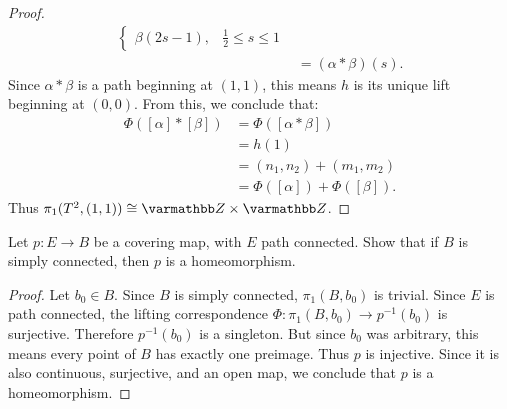 \documentclass[10pt,oneside,openany]{memoir}
\begin{document}
\begin{proof}
\begin{align*}
\begin{cases}
				\beta(2s-1), & \frac{1}{2} \leq s \leq 1
				\end{cases} \\
			&= (\alpha * \beta)(s).
		\end{align*}
	Since $\alpha \ast \beta$ is a path beginning at $(1,1)$, this means $h$ is its unique lift beginning at $(0,0)$. From this, we conclude that:
		\begin{align*}
			\Phi([\alpha] \ast [\beta])
			&= \Phi([\alpha \ast \beta]) \\
			&= h(1) \\
			&= (n_1,n_2) + (m_1,m_2) \\
			&= \Phi([\alpha]) + \Phi([\beta]).
		\end{align*}
	Thus $\pi_1(T^2,(1,1)) \cong \bfZ \times \bfZ$.
	\end{proof}
	\begin{exercise}[manual-num={8}]
	Let $p:E \rightarrow B$ be a covering map, with $E$ path connected. Show that if $B$ is simply connected, then $p$ is a homeomorphism.
\end{exercise}
	\begin{proof}
		Let $b_0 \in B$. Since $B$ is simply connected, $\pi_1(B,b_0)$ is trivial. Since $E$ is path connected, the lifting correspondence $\Phi:\pi_1(B,b_0) \rightarrow p^{-1}(b_0)$ is surjective. Therefore $p^{-1}(b_0)$ is a singleton. But since $b_0$ was arbitrary, this means every point of $B$ has exactly one preimage. Thus $p$ is injective. Since it is also continuous, surjective, and an open map, we conclude that $p$ is a homeomorphism.
	\end{proof}
\end{document}
